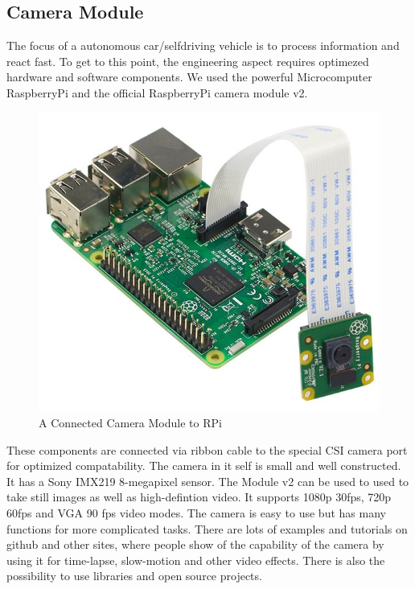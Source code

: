 \documentclass[conference]{IEEEtran}
\begin{document}
\subsection{Camera Module}
The focus of a autonomous car/selfdriving vehicle is to process information and react fast. To get to this point, the engineering aspect requires optimezed hardware and software components. We used the powerful Microcomputer RaspberryPi and the official RaspberryPi camera module v2. 
\begin{figure}[h!]
	\includegraphics[width=\linewidth]{CameraModule.png}
	\caption{A Connected Camera Module to RPi}
	\label{fig:CMRPi}
\end{figure}
These components are connected via ribbon cable to the special CSI camera port for optimized compatability. The camera in it self is small and well constructed. It has a Sony IMX219 8-megapixel sensor. The Module v2 can be used to used to take still images as well as high-defintion video. It supports  1080p 30fps, 720p 60fps and VGA 90 fps video modes. The camera is easy to use but has many functions for more complicated tasks. There are lots of examples and tutorials on github and other sites, where people show of the capability of the camera by using it for time-lapse, slow-motion and other video effects. There is also the possibility to use libraries and open source projects. 
\newline
\end{document}
